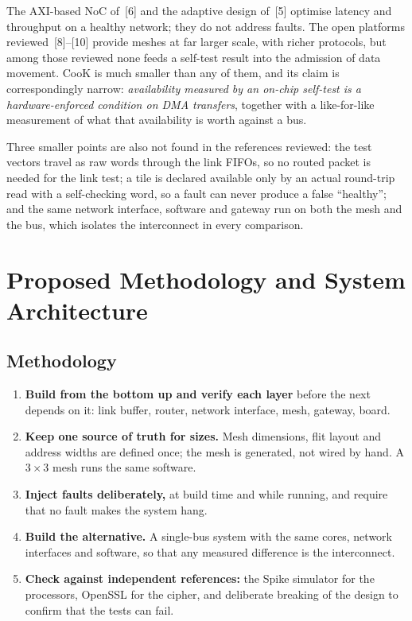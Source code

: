 \documentclass[11pt,a4paper]{article}
\begin{document}
The AXI-based NoC of~[6] and the adaptive design of~[5] optimise latency and
throughput on a healthy network; they do not address faults. The open
platforms reviewed~[8]--[10] provide meshes at far larger scale, with richer
protocols, but among those reviewed none feeds a self-test result into the
admission of data movement. CooK is much smaller than any of them, and its
claim is correspondingly narrow: \emph{availability measured by an on-chip
self-test is a hardware-enforced condition on DMA transfers}, together with a
like-for-like measurement of what that availability is worth against a bus.

Three smaller points are also not found in the references reviewed: the test
vectors travel as raw words through the link FIFOs, so no routed packet is
needed for the link test; a tile is declared available only by an actual
round-trip read with a self-checking word, so a fault can never produce a
false ``healthy''; and the same network interface, software and gateway run on
both the mesh and the bus, which isolates the interconnect in every
comparison.

\section{Proposed Methodology and System Architecture}

\subsection{Methodology}

\begin{enumerate}
\item \textbf{Build from the bottom up and verify each layer} before the next
depends on it: link buffer, router, network interface, mesh, gateway, board.
\item \textbf{Keep one source of truth for sizes.} Mesh dimensions, flit
layout and address widths are defined once; the mesh is generated, not wired
by hand. A $3\times3$ mesh runs the same software.
\item \textbf{Inject faults deliberately,} at build time and while running,
and require that no fault makes the system hang.
\item \textbf{Build the alternative.} A single-bus system with the same
cores, network interfaces and software, so that any measured difference is
the interconnect.
\item \textbf{Check against independent references:} the Spike simulator for
the processors, OpenSSL for the cipher, and deliberate breaking of the design
to confirm that the tests can fail.
\end{enumerate}
\end{document}
